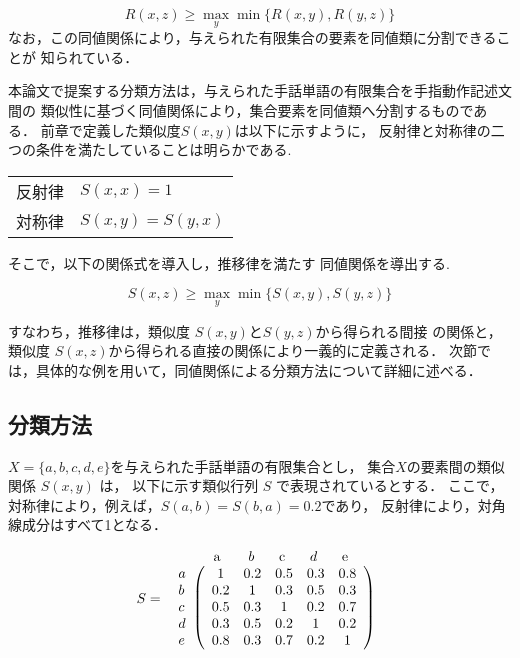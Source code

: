 \[
 R(x,z) \ge \max_{y}\min\{R(x,y),R(y,z)\}
\]
なお，この同値関係により，与えられた有限集合の要素を同値類に分割できることが
知られている\cite{Klir1988}．

本論文で提案する分類方法は，与えられた手話単語の有限集合を手指動作記述文間の
類似性に基づく同値関係により，集合要素を同値類へ分割するものである．
前章で定義した類似度$S(x,y)$は以下に示すように，
反射律と対称律の二つの条件を満たしていることは明らかである.

\begin{center}
\begin{tabular}{ll}
反射律 & $S(x,x) = 1$\\
対称律 & $S(x,y) = S(y,x)$\\
\end{tabular}
\end{center}

そこで，以下の関係式を導入し，推移律を満たす
同値関係を導出する.

\begin{equation}
\label{eq:suii}
S(x,z) \ge \max_{y}\min\{S(x,y),S(y,z)\}
\end{equation}

すなわち，推移律は，類似度 $S(x,y)$と$S(y,z)$から得られる{\gt 間接}
の関係と，類似度 $S(x,z)$から得られる{\gt 直接}の関係により一義的に定義される．
次節では，具体的な例を用いて，同値関係による分類方法について詳細に述べる．

\subsection{分類方法}\label{tejun}

$X = \{a,b,c,d,e \}$を与えられた手話単語の有限集合とし，
集合$X$の要素間の類似関係 $S(x,y)$ は，
以下に示す類似行列 $S$ で表現されているとする．
ここで，対称律により，例えば，$S(a,b)=S(b,a)=0.2$であり，
反射律により，対角線成分はすべて1となる．

\[ S = 
\begin{array}{r@{}l}
& \begin{array}{ccccc}
\makebox[2.5em]{a}& b& \makebox[2.0em]{c}& d& \makebox[2.0em]{e}
\end{array}\\
\begin{array}{l}
a\\ b\\ c\\ d\\ e
\end{array} &
\left(
\begin{array}{ccccc}
1 & 0.2 & 0.5 & 0.3 & 0.8 \\
0.2 & 1 & 0.3 & 0.5 & 0.3 \\
0.5 & 0.3 & 1 & 0.2 & 0.7 \\
0.3 & 0.5 & 0.2 & 1 & 0.2 \\
0.8 & 0.3 & 0.7 & 0.2 & 1
\end{array}
\right)
\end{array}
\]

